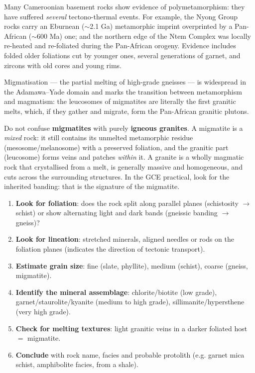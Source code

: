 \documentclass[11pt]{article}
\newcommand{\cle}[1]{{\popxbold\color{popdark}#1}}
\newcounter{popsec}
\newcounter{popsub}
\newcommand{\courssub}[1]{%
  \stepcounter{popsub}%
  \par\vspace{9pt}\noindent{\popxbold\fontsize{11.5}{13}\selectfont\color{popink}{\color{poporange}\thepopsec.\thepopsub}\hspace{6pt}#1}\par\nopagebreak\vspace{4pt}
}
\begin{document}
\courssub{Polymetamorphism and Migmatisation}

Many Cameroonian basement rocks show evidence of \cle{polymetamorphism}: they have suffered \emph{several} tectono-thermal events. For example, the Nyong Group rocks carry an Eburnean ($\sim$2.1 Ga) metamorphic imprint overprinted by a Pan-African ($\sim$600 Ma) one; and the northern edge of the Ntem Complex was locally re-heated and re-foliated during the Pan-African orogeny. Evidence includes folded older foliations cut by younger ones, several generations of garnet, and zircons with old cores and young rims.

\cle{Migmatisation} --- the partial melting of high-grade gneisses --- is widespread in the Adamawa--Yade domain and marks the transition between metamorphism and magmatism: the leucosomes of migmatites are literally the first granitic melts, which, if they gather and migrate, form the Pan-African granitic plutons.

\begin{attention}
Do not confuse \textbf{migmatites} with purely \textbf{igneous granites}. A migmatite is a \emph{mixed} rock: it still contains its unmelted metamorphic residue (mesosome/melanosome) with a preserved foliation, and the granitic part (leucosome) forms veins and patches \emph{within} it. A granite is a wholly magmatic rock that crystallised from a melt, is generally massive and homogeneous, and cuts across the surrounding structures. In the GCE practical, look for the inherited banding: that is the signature of the migmatite.
\end{attention}

\begin{methode}
\begin{enumerate}
\item \textbf{Look for foliation}: does the rock split along parallel planes (schistosity $\rightarrow$ schist) or show alternating light and dark bands (gneissic banding $\rightarrow$ gneiss)?
\item \textbf{Look for lineation}: stretched minerals, aligned needles or rods on the foliation planes (indicates the direction of tectonic transport).
\item \textbf{Estimate grain size}: fine (slate, phyllite), medium (schist), coarse (gneiss, migmatite).
\item \textbf{Identify the mineral assemblage}: chlorite/biotite (low grade), garnet/staurolite/kyanite (medium to high grade), sillimanite/hypersthene (very high grade).
\item \textbf{Check for melting textures}: light granitic veins in a darker foliated host $=$ migmatite.
\item \textbf{Conclude} with rock name, facies and probable protolith (e.g. garnet mica schist, amphibolite facies, from a shale).
\end{enumerate}
\end{methode}
\end{document}
